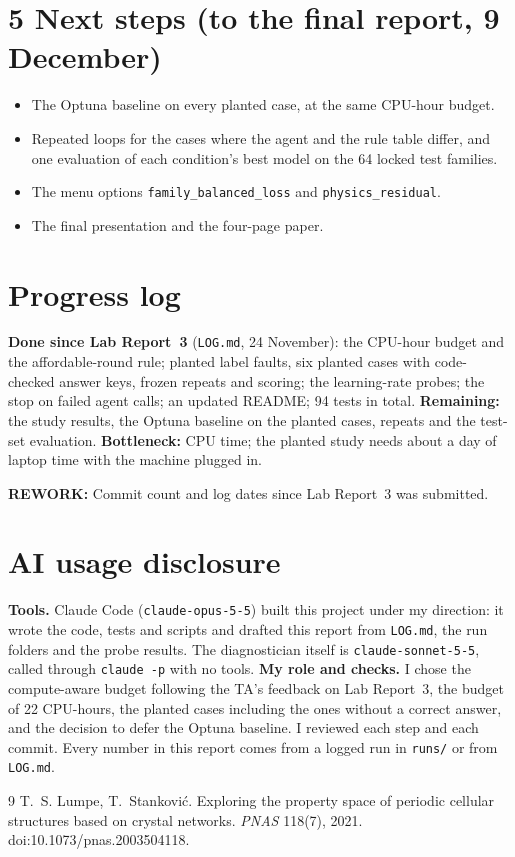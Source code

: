 \documentclass[11pt]{article}
\newcommand{\rework}[1]{\noindent\colorbox{yellow!40}{\parbox{\dimexpr\linewidth-2\fboxsep}{%
  \small\textbf{REWORK:} #1}}\par}
\begin{document}
\section*{5 \quad Next steps (to the final report, 9 December)}
\begin{itemize}
\item The Optuna baseline on every planted case, at the same CPU-hour budget.
\item Repeated loops for the cases where the agent and the rule table differ, and one evaluation
  of each condition's best model on the 64 locked test families.
\item The menu options \texttt{family\_balanced\_loss} and \texttt{physics\_residual}.
\item The final presentation and the four-page paper.
\end{itemize}

\section*{Progress log}
\textbf{Done since Lab Report~3} (\texttt{LOG.md}, 24 November): the CPU-hour budget and the
affordable-round rule; planted label faults, six planted cases with code-checked answer keys,
frozen repeats and scoring; the learning-rate probes; the stop on failed agent calls; an updated
README; 94 tests in total.
\textbf{Remaining:} the study results, the Optuna baseline on the planted cases, repeats and the
test-set evaluation. \textbf{Bottleneck:} CPU time; the planted study needs about a day of laptop
time with the machine plugged in.
\rework{Commit count and log dates since Lab Report~3 was submitted.}

\section*{AI usage disclosure}
\textbf{Tools.} Claude Code (\texttt{claude-opus-5-5}) built this project under my direction: it
wrote the code, tests and scripts and drafted this report from \texttt{LOG.md}, the run folders
and the probe results. The diagnostician itself is \texttt{claude-sonnet-5-5}, called through
\texttt{claude -p} with no tools.
\textbf{My role and checks.} I chose the compute-aware budget following the TA's feedback on Lab
Report~3, the budget of 22 CPU-hours, the planted cases including the ones without a correct
answer, and the decision to defer the Optuna baseline. I reviewed each step and each commit.
Every number in this report comes from a logged run in \texttt{runs/} or from \texttt{LOG.md}.

\begin{thebibliography}{9}\footnotesize\setlength{\itemsep}{0pt}
 T.~S. Lumpe, T.~Stankovi\'c. Exploring the property space of periodic cellular
  structures based on crystal networks. \emph{PNAS} 118(7), 2021. doi:10.1073/pnas.2003504118.
\end{thebibliography}
\end{document}

